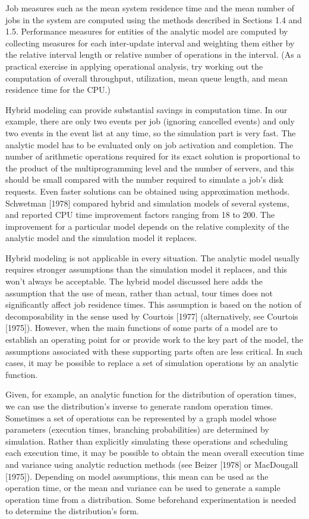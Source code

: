 Job measures such as the mean system residence time and the mean number of
jobs in the system are computed using the methods described in Sections 1.4
and 1.5. Performance measures for entities of the analytic model are computed
by collecting measures for each inter-update interval and weighting them
 either by the relative interval length or relative number of operations in the
interval. (As a practical exercise in applying operational analysis, try
working out the computation of overall throughput, utilization, mean queue
length, and mean residence time for the CPU.)

Hybrid modeling can provide substantial savings in computation time. In our
example, there are only two events per job (ignoring cancelled events) and
only two events in the event list at any time, so the simulation part is very
fast. The analytic model has to be evaluated only on job activation and
completion. The number of arithmetic operations required for its exact
solution is proportional to the product of the multiprogramming level and the
number of servers, and this should be small compared with the number required
 to simulate a job's disk requests. Even faster solutions can be obtained using
approximation methods. Schwetman [1978] compared hybrid and simulation models
of several systems, and reported CPU time improvement factors ranging from 18
 to 200. The improvement for a particular model depends on the relative
complexity of the analytic model and the simulation model it replaces.

Hybrid modeling is not applicable in every situation. The analytic model
usually requires stronger assumptions than the simulation model it replaces,
and this won't always be acceptable. The hybrid model discussed here adds the
assumption that the use of mean, rather than actual, tour times does not
significantly affect job residence times. This assumption is based on the
notion of decomposability in the sense used by Courtois [1977] (alternatively,
see Courtois [1975]). However, when the main functions of some parts of a
model are to establish an operating point for or provide work to the key part
of the model, the assumptions associated with these supporting parts often are
less critical. In such cases, it may be possible to replace a set of
simulation operations by an analytic function.

Given, for example, an analytic function for the distribution of operation
times, we can use the distribution's inverse to generate random operation
times. Sometimes a set of operations can be represented by a graph model whose
parameters (execution times, branching probabilities) are determined by
simulation. Rather than explicitly simulating these operations and scheduling
each execution time, it may be possible to obtain the mean overall execution
time and variance using analytic reduction methods (see Beizer [1978] or
MacDougall [1975]). Depending on model assumptions, this mean can be used as
the operation time, or the mean and variance can be used to generate a sample
operation time from a distribution. Some beforehand experimentation is needed
to determine the distribution's form.

